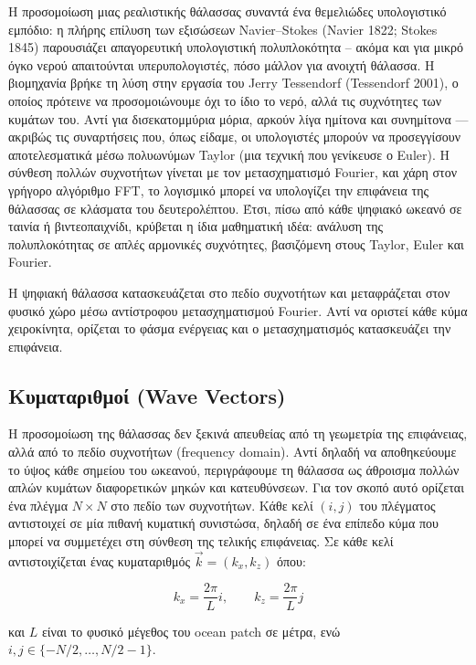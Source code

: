 \documentclass[a4paper, 11pt]{article}
\begin{document}
Η προσομοίωση μιας ρεαλιστικής θάλασσας συναντά ένα θεμελιώδες
υπολογιστικό εμπόδιο: η πλήρης επίλυση των εξισώσεων Navier--Stokes
(Navier 1822; Stokes 1845) παρουσιάζει απαγορευτική υπολογιστική
πολυπλοκότητα -- ακόμα και για μικρό όγκο νερού απαιτούνται
υπερυπολογιστές, πόσο μάλλον για ανοιχτή θάλασσα. Η βιομηχανία βρήκε τη
λύση στην εργασία του Jerry Tessendorf (Tessendorf 2001), ο οποίος
πρότεινε να προσομοιώνουμε όχι το ίδιο το νερό, αλλά τις συχνότητες των
κυμάτων του. Αντί για δισεκατομμύρια μόρια, αρκούν λίγα ημίτονα και
συνημίτονα --- ακριβώς τις συναρτήσεις που, όπως είδαμε, οι υπολογιστές
μπορούν να προσεγγίσουν αποτελεσματικά μέσω πολυωνύμων Taylor (μια
τεχνική που γενίκευσε ο Euler). Η σύνθεση πολλών συχνοτήτων γίνεται με
τον μετασχηματισμό Fourier, και χάρη στον γρήγορο αλγόριθμο FFT, το
λογισμικό μπορεί να υπολογίζει την επιφάνεια της θάλασσας σε κλάσματα
του δευτερολέπτου. Έτσι, πίσω από κάθε ψηφιακό ωκεανό σε ταινία ή
βιντεοπαιχνίδι, κρύβεται η ίδια μαθηματική ιδέα: ανάλυση της
πολυπλοκότητας σε απλές αρμονικές συχνότητες, βασιζόμενη στους Taylor,
Euler και Fourier.

Η ψηφιακή θάλασσα κατασκευάζεται στο πεδίο συχνοτήτων και μεταφράζεται
στον φυσικό χώρο μέσω αντίστροφου μετασχηματισμού Fourier. Αντί να
οριστεί κάθε κύμα χειροκίνητα, ορίζεται το φάσμα ενέργειας και ο
μετασχηματισμός κατασκευάζει την επιφάνεια.

\subsection{Κυματαριθμοί (Wave
Vectors)}\label{ux3baux3c5ux3bcux3b1ux3c4ux3b1ux3c1ux3b9ux3b8ux3bcux3bfux3af-wave-vectors}

Η προσομοίωση της θάλασσας δεν ξεκινά απευθείας από τη γεωμετρία της
επιφάνειας, αλλά από το πεδίο συχνοτήτων (frequency domain). Αντί δηλαδή
να αποθηκεύουμε το ύψος κάθε σημείου του ωκεανού, περιγράφουμε τη
θάλασσα ως άθροισμα πολλών απλών κυμάτων διαφορετικών μηκών και
κατευθύνσεων. Για τον σκοπό αυτό ορίζεται ένα πλέγμα \(N \times N\) στο
πεδίο των συχνοτήτων. Κάθε κελί \((i,j)\) του πλέγματος αντιστοιχεί σε
μία πιθανή κυματική συνιστώσα, δηλαδή σε ένα επίπεδο κύμα που μπορεί να
συμμετέχει στη σύνθεση της τελικής επιφάνειας. Σε κάθε κελί
αντιστοιχίζεται ένας κυματαριθμός \(\vec{k} = (k_x, k_z)\) όπου:

\[
k_x = \frac{2\pi}{L}i,
\qquad
k_z = \frac{2\pi}{L}j
\]

και \(L\) είναι το φυσικό μέγεθος του ocean patch σε μέτρα, ενώ
\(i,j \in \{-N/2,\dots,N/2-1\}\).
\end{document}
